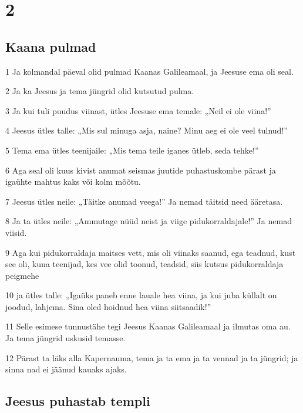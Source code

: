\chapter{2}

\section*{Kaana pulmad}

\par 1 Ja kolmandal päeval olid pulmad Kaanas Galileamaal, ja Jeesuse ema oli seal.
\par 2 Ja ka Jeesus ja tema jüngrid olid kutsutud pulma.
\par 3 Ja kui tuli puudus viinast, ütles Jeesuse ema temale: „Neil ei ole viina!”
\par 4 Jeesus ütles talle: „Mis sul minuga asja, naine? Minu aeg ei ole veel tulnud!”
\par 5 Tema ema ütles teenijaile: „Mis tema teile iganes ütleb, seda tehke!”
\par 6 Aga seal oli kuus kivist anumat seismas juutide puhastuskombe pärast ja igaühte mahtus kaks või kolm mõõtu.
\par 7 Jeesus ütles neile: „Täitke anumad veega!” Ja nemad täitsid need ääretasa.
\par 8 Ja ta ütles neile: „Ammutage nüüd neist ja viige pidukorraldajale!” Ja nemad viisid.
\par 9 Aga kui pidukorraldaja maitses vett, mis oli viinaks saanud, ega teadnud, kust see oli, kuna teenijad, kes vee olid toonud, teadsid, siis kutsus pidukorraldaja peigmehe
\par 10 ja ütles talle: „Igaüks paneb enne lauale hea viina, ja kui juba küllalt on joodud, lahjema. Sina oled hoidnud hea viina siitsaadik!”
\par 11 Selle esimese tunnustähe tegi Jeesus Kaanas Galileamaal ja ilmutas oma au. Ja tema jüngrid uskusid temasse.
\par 12 Pärast ta läks alla Kapernauma, tema ja ta ema ja ta vennad ja ta jüngrid; ja sinna nad ei jäänud kauaks ajaks.

\section*{Jeesus puhastab templi}

